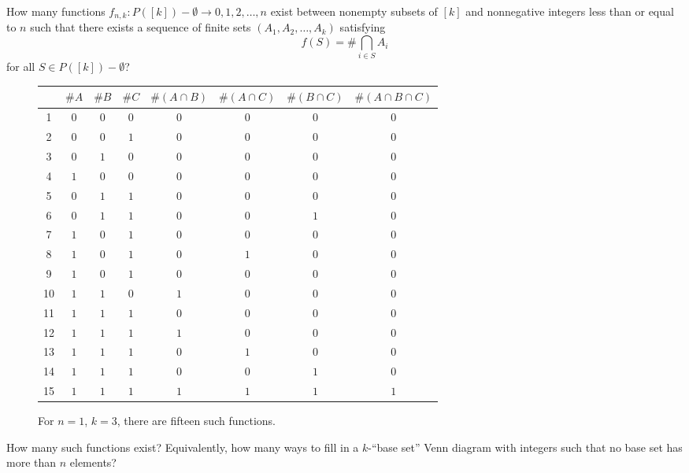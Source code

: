 \documentclass{article}
\begin{document}
How many functions $f_{n, k}\colon P([k]) - \emptyset \rightarrow {0, 1, 2, \hdots, n}$
exist between nonempty subsets of $[k]$ and nonnegative integers less than or
equal to $n$ such that there exists a sequence of finite sets
$(A_1, A_2, \hdots, A_k)$ satisfying \[
  f(S) = \#\bigcap_{i \in S} A_i
\] for all $S \in P([k]) - \emptyset$?
\begin{figure}[ht!]
  \centering
    \begin{tabular}{|c||c|c|c|c|c|c|c|}
      \hline
         & $\#A$ & $\#B$ & $\#C$ & $\#(A \cap B)$ & $\#(A \cap C)$ & $\#(B \cap C)$ & $\#(A \cap B \cap C)$\\
      \hline
      1  & $0$   & $0$   & $0$   & $0$            & $0$            & $0$            &  $0$\\
      2  & $0$   & $0$   & $1$   & $0$            & $0$            & $0$            &  $0$\\
      3  & $0$   & $1$   & $0$   & $0$            & $0$            & $0$            &  $0$\\
      4  & $1$   & $0$   & $0$   & $0$            & $0$            & $0$            &  $0$\\
      5  & $0$   & $1$   & $1$   & $0$            & $0$            & $0$            &  $0$\\
      6  & $0$   & $1$   & $1$   & $0$            & $0$            & $1$            &  $0$\\
      7  & $1$   & $0$   & $1$   & $0$            & $0$            & $0$            &  $0$\\
      8  & $1$   & $0$   & $1$   & $0$            & $1$            & $0$            &  $0$\\
      9  & $1$   & $0$   & $1$   & $0$            & $0$            & $0$            &  $0$\\
      10 & $1$   & $1$   & $0$   & $1$            & $0$            & $0$            &  $0$\\
      11 & $1$   & $1$   & $1$   & $0$            & $0$            & $0$            &  $0$\\
      12 & $1$   & $1$   & $1$   & $1$            & $0$            & $0$            &  $0$\\
      13 & $1$   & $1$   & $1$   & $0$            & $1$            & $0$            &  $0$\\
      14 & $1$   & $1$   & $1$   & $0$            & $0$            & $1$            &  $0$\\
      15 & $1$   & $1$   & $1$   & $1$            & $1$            & $1$            &  $1$\\
      \hline
    \end{tabular}
  \caption{
    For $n=1$, $k=3$, there are fifteen such functions.
  }
\end{figure}
\begin{question}
  How many such functions exist? Equivalently, how many ways to fill in a
  $k$-``base set'' Venn diagram with integers such that no base set has more
  than $n$ elements?
\end{question}
\end{document}
